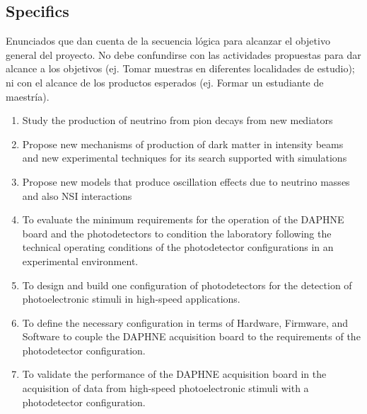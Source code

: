 \documentclass[a4paper,10pt,epsfig,epsf,amsfonts,amsmath]{article}
\begin{document}
\subsection{Specifics}
\label{sec:objet-espec}
\begin{colciencias}
  Enunciados que dan cuenta de la secuencia lógica para alcanzar el
  objetivo general del proyecto. No debe confundirse con las
  actividades propuestas para dar alcance a los objetivos (ej. Tomar
  muestras en diferentes localidades de estudio); ni con el alcance de
  los productos esperados (ej. Formar un estudiante de maestría).
\end{colciencias}
\begin{enumerate}
  
\item Study the production of neutrino from pion decays from new mediators 

\item Propose new mechanisms of production of dark matter in intensity
  beams and new experimental techniques for its search supported with
  simulations
  \item Propose new models that produce oscillation effects due to neutrino masses and also NSI interactions
  
\item To evaluate the minimum requirements for the operation of the DAPHNE board and the photodetectors to condition the laboratory following the technical operating conditions of the photodetector configurations in an experimental environment.

\item To design and build one configuration of photodetectors for the detection of photoelectronic stimuli in high-speed applications.

\item To define the necessary configuration in terms of Hardware, Firmware, and Software to couple the DAPHNE acquisition board to the requirements of the photodetector configuration.

\item To validate the performance of the DAPHNE acquisition board in the acquisition of data from high-speed photoelectronic stimuli with a photodetector configuration.


\end{enumerate}
\end{document}
